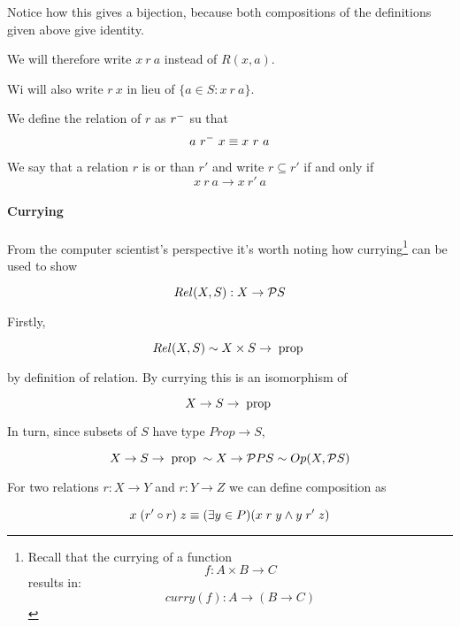 Notice how this gives a bijection, because both compositions of the
definitions given above give identity.

We will therefore write $x\ r\ a$ instead of $R(x,a)$.

Wi will also write $r\ x$ in lieu of $\{a \in S : x\ r\ a\}$.

\begin{definition}[Inverse] We define the  relation
  of $r$ as $r^{-}$ su that
  \[ a\ r^{-}\ x \equiv x\ r\ a \]
\end{definition}

\begin{definition} We say that a relation $r$ is
   or  than $r'$ and write \(r
  \subseteq r'\) if and only if
  \[ x\ r\ a \rightarrow x\ r'\ a \]

\end{definition}


\paragraph{Currying} From the computer scientist's perspective it's
worth noting how currying\footnote{ Recall that the currying of a
  function
  \[ f : A \times B \rightarrow C \] results in:
  \[ curry(f): A \rightarrow (B \rightarrow C) \] } can be used to
show

\[ Rel(X,S) : X \rightarrow \mathcal{P}S \]

Firstly,

\[ {Rel}(X,S) \sim X \times S \rightarrow \; \text{prop}\; \]

by definition of relation.  By currying this is an isomorphism of

\[ X \rightarrow S \rightarrow \; \text{prop}\; \]

In turn, since subsets of $S$ have type $Prop \rightarrow S$,

\[ X \rightarrow S \rightarrow \; \text{prop}\; \sim X \rightarrow \mathcal{P}P{S}
  \sim {Op}(X,\mathcal{P}S) \]

\begin{definition} For two relations \(r : X
  \rightarrow Y\) and \(r : Y \rightarrow Z\) we can define composition
  as

  \[ x\; (r' \circ r)\; z \equiv (\exists y \in P)(x\; r\; y \wedge y\;
    r'\; z) \]
\end{definition}

